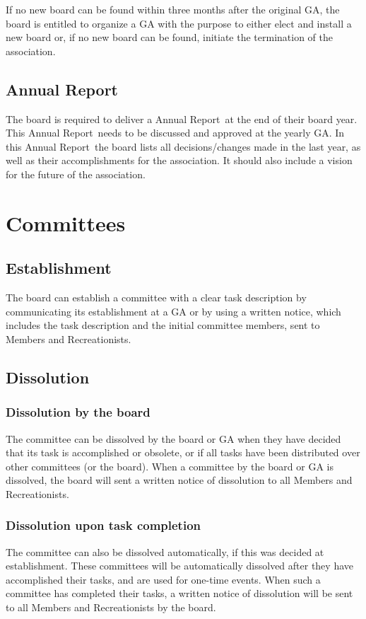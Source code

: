 \documentclass[a4paper]{article}
\newcommand{\Ajv}{Annual Report} %
\begin{document}
If no new board can be found within three months after the original GA, the board is entitled to organize a GA with the purpose to either elect and install a new board or, if no new board can be found, initiate the termination of the association.

\subsection{\Ajv}
The board is required to deliver a \Ajv\ at the end of their board year. This \Ajv\ needs to be discussed and approved at the yearly GA. In this \Ajv\ the board lists all decisions/changes made in the last year, as well as their accomplishments for the association. It should also include a vision for the future of the association.

\pagebreak

\section{Committees}
\subsection{Establishment}
The board can establish a committee with a clear task description by communicating its establishment at a GA or by using a written notice, which includes the task description and the initial committee members, sent to Members and Recreationists.

\subsection{Dissolution}
\subsubsection{Dissolution by the board}
The committee can be dissolved by the board or GA when they have decided that its task is accomplished or obsolete, or if all tasks have been distributed over other committees (or the board). When a committee by the board or GA is dissolved, the board will sent a written notice of dissolution to all Members and Recreationists.

\subsubsection{Dissolution upon task completion}
The committee can also be dissolved automatically, if this was decided at establishment. These committees will be automatically dissolved after they have accomplished their tasks, and are used for one-time events. When such a committee has completed their tasks, a written notice of dissolution will be sent to all Members and Recreationists by the board.
\end{document}
